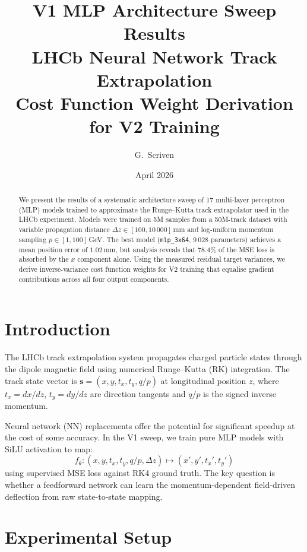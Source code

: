 \documentclass[11pt,a4paper]{article}
\title{%
  \textbf{V1 MLP Architecture Sweep Results}\\[4pt]
  \large LHCb Neural Network Track Extrapolation\\[4pt]
  \normalsize Cost Function Weight Derivation for V2 Training
}
\author{G.\ Scriven}
\date{April 2026}
\newcommand{\dz}{\Delta z}
\newcommand{\qop}{q/p}
\newcommand{\tx}{t_x}
\newcommand{\ty}{t_y}
\begin{document}
\maketitle

\begin{abstract}
We present the results of a systematic architecture sweep of 17 multi-layer perceptron (MLP) models trained to approximate the Runge--Kutta track extrapolator used in the LHCb experiment.
Models were trained on 5M samples from a 50M-track dataset with variable propagation distance $\dz\in[100,10\,000]$\,mm and log-uniform momentum sampling $p\in[1,100]$\,GeV.
The best model (\texttt{mlp\_3x64}, 9\,028 parameters) achieves a mean position error of $1.02$\,mm, but analysis reveals that 78.4\% of the MSE loss is absorbed by the $x$ component alone.
Using the measured residual target variances, we derive inverse-variance cost function weights for V2 training that equalise gradient contributions across all four output components.
\end{abstract}

\tableofcontents
\newpage

\section{Introduction}
\label{sec:intro}

The LHCb track extrapolation system propagates charged particle states through the dipole magnetic field using numerical Runge--Kutta (RK) integration.
The track state vector is $\mathbf{s} = (x, y, \tx, \ty, \qop)$ at longitudinal position $z$, where $\tx = dx/dz$, $\ty = dy/dz$ are direction tangents and $\qop$ is the signed inverse momentum.

Neural network (NN) replacements offer the potential for significant speedup at the cost of some accuracy.
In the V1 sweep, we train pure MLP models with SiLU activation to map:
\begin{equation}
  f_\theta : (x, y, \tx, \ty, \qop, \dz) \mapsto (x', y', \tx', \ty')
  \label{eq:nn_map}
\end{equation}
using supervised MSE loss against RK4 ground truth.
The key question is whether a feedforward network can learn the momentum-dependent field-driven deflection from raw state-to-state mapping.

\section{Experimental Setup}
\label{sec:setup}
\end{document}
